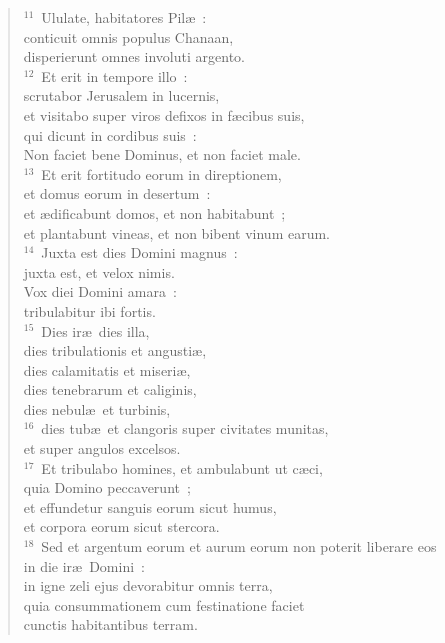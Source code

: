 \begin{flushleft}
\begin{verse}
${}^{11}$~Ululate, habitatores Pil\ae~:\\ conticuit omnis populus Chanaan,\\ disperierunt omnes involuti argento.\\
${}^{12}$~Et erit in tempore illo~:\\ scrutabor Jerusalem in lucernis,\\ et visitabo super viros defixos in f\ae cibus suis,\\ qui dicunt in cordibus suis~:\\ Non faciet bene Dominus, et non faciet male.\\
${}^{13}$~Et erit fortitudo eorum in direptionem,\\ et domus eorum in desertum~:\\ et \ae dificabunt domos, et non habitabunt~;\\ et plantabunt vineas, et non bibent vinum earum.\\
${}^{14}$~Juxta est dies Domini magnus~:\\ juxta est, et velox nimis.\\ Vox diei Domini amara~:\\ tribulabitur ibi fortis.\\
${}^{15}$~Dies ir\ae\ dies illa,\\ dies tribulationis et angusti\ae ,\\ dies calamitatis et miseri\ae ,\\ dies tenebrarum et caliginis,\\ dies nebul\ae\ et turbinis,\\
${}^{16}$~dies tub\ae\ et clangoris super civitates munitas,\\ et super angulos excelsos.\\
${}^{17}$~Et tribulabo homines, et ambulabunt ut c\ae ci,\\ quia Domino peccaverunt~;\\ et effundetur sanguis eorum sicut humus,\\ et corpora eorum sicut stercora.\\
${}^{18}$~Sed et argentum eorum et aurum eorum non poterit liberare eos\\ in die ir\ae\ Domini~:\\ in igne zeli ejus devorabitur omnis terra,\\ quia consummationem cum festinatione faciet\\ cunctis habitantibus terram.\end{verse}\end{flushleft}


